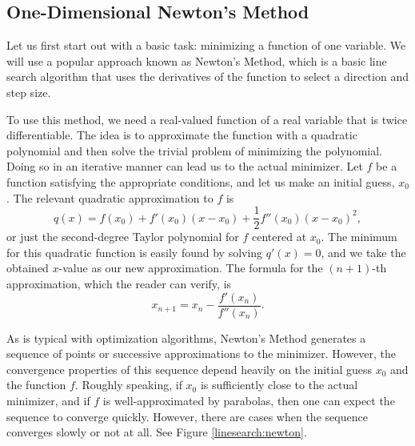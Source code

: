 \subsection*{One-Dimensional Newton's Method}
Let us first start out with a basic task: minimizing a function of one variable.
We will use a popular approach known as Newton's Method, which is a basic line search
algorithm that uses the derivatives of the function to select a direction and
step size.

To use this method, we need a real-valued function of a real variable that is twice
differentiable. The idea is to approximate the function with a quadratic polynomial and
then solve the trivial problem of minimizing the polynomial. Doing so in an iterative
manner can lead us to the actual minimizer. Let $f$ be a function satisfying the
appropriate conditions, and let us make an initial guess, $x_0$. The relevant quadratic
approximation to $f$ is
\begin{equation*}
q(x) = f(x_0) + f'(x_0)(x-x_0) + \frac{1}{2}f''(x_0)(x-x_0)^2,
\end{equation*}
or just the second-degree Taylor polynomial for $f$ centered at $x_0$. The minimum
for this quadratic function is easily found by solving $q'(x) = 0$, and we take the
obtained $x$-value as our new approximation. The formula for the $(n+1)$-th
approximation, which the reader can verify, is
\begin{equation*}
x_{n+1} = x_n - \frac{f'(x_n)}{f''(x_n)}.
\end{equation*}

As is typical with optimization algorithms, Newton's Method generates a sequence of
points or successive approximations to the minimizer. However, the convergence
properties of this sequence depend heavily on the initial guess $x_0$ and the function
$f$. Roughly speaking, if $x_0$ is sufficiently close to the actual minimizer, and if
$f$ is well-approximated by parabolas, then one can expect the sequence to converge
quickly. However, there are cases when the sequence converges slowly or not at all.
See Figure \ref{linesearch:newton}.


